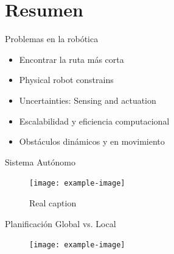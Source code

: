 \documentclass[
	11pt, %
]{beamer}
\begin{document}


\section{Resumen}

\begin{frame}{Problemas en la rob\'{o}tica}
  \begin{itemize}
  \item Encontrar la ruta m\'{a}s corta
  \item Physical robot constrains
  \item Uncertainties: Sensing and actuation
  \item Escalabilidad y eficiencia computacional
  \item Obst\'{a}culos din\'{a}micos y en movimiento
  \end{itemize}
\end{frame}

\begin{frame}{Sistema Aut\'{o}nomo}
  \begin{figure}
    \centering
    \texttt{[image: example-image]}
    \caption[Caption for LOF]{Real caption\protect\footnotemark}
  \end{figure}
\end{frame}

\begin{frame}{Planificaci\'{o}n Global vs. Local}
  \begin{figure}
    \centering
    \texttt{[image: example-image]}
  \end{figure}
\end{frame}
\end{document}
